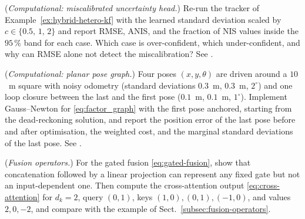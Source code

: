 \begin{prob}\label{prob:ch04:6}
(\emph{Computational: miscalibrated uncertainty head.}) Re-run the tracker of Example~\ref{ex:hybrid-hetero-kf} with the learned standard deviation scaled by $c\in\{0.5,\,1,\,2\}$ and report RMSE, ANIS, and the fraction of NIS values inside the $95\,\%$ band for each case. Which case is over-confident, which under-confident, and why can RMSE alone not detect the miscalibration? See .
\end{prob}
\begin{prob}\label{prob:ch04:7}
(\emph{Computational: planar pose graph.}) Four poses $(x,y,\theta)$ are driven around a $10$~m square with noisy odometry (standard deviations $0.3$~m, $0.3$~m, $2^{\circ}$) and one loop closure between the last and the first pose ($0.1$~m, $0.1$~m, $1^{\circ}$). Implement Gauss--Newton for \eqref{eq:factor_graph} with the first pose anchored, starting from the dead-reckoning solution, and report the position error of the last pose before and after optimisation, the weighted cost, and the marginal standard deviations of the last pose. See .
\end{prob}
\begin{prob}\label{prob:ch04:8}
(\emph{Fusion operators.}) For the gated fusion \eqref{eq:gated-fusion}, show that concatenation followed by a linear projection can represent any fixed gate but not an input-dependent one. Then compute the cross-attention output \eqref{eq:cross-attention} for $d_k=2$, query $(0,1)$, keys $(1,0),(0,1),(-1,0)$, and values $2,0,-2$, and compare with the example of Sect.~\ref{subsec:fusion-operators}.
\end{prob}


